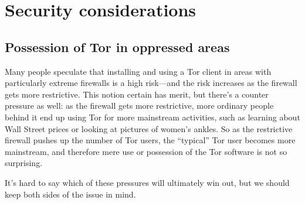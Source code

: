 \documentclass{llncs}
\begin{document}






\section{Security considerations}
\label{sec:security}

\subsection{Possession of Tor in oppressed areas}

Many people speculate that installing and using a Tor client in areas with
particularly extreme firewalls is a high risk---and the risk increases
as the firewall gets more restrictive. This notion certain has merit, but
there's
a counter pressure as well: as the firewall gets more restrictive, more
ordinary people behind it end up using Tor for more mainstream activities,
such as learning
about Wall Street prices or looking at pictures of women's ankles. So
as the restrictive firewall pushes up the number of Tor users, the
``typical'' Tor user becomes more mainstream, and therefore mere
use or possession of the Tor software is not so surprising.

It's hard to say which of these pressures will ultimately win out,
but we should keep both sides of the issue in mind.
\end{document}

